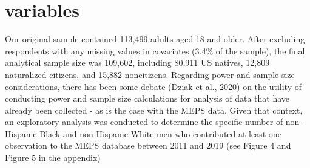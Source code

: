 \documentclass[../main.tex]{subfiles}
\begin{document}
\section{variables}

Our original sample contained 113,499 adults aged 18 and older. After excluding respondents with any missing values in covariates (3.4\% of the sample), the final
analytical sample size was 109,602, including 80,911 US natives, 12,809 naturalized citizens, and 15,882 noncitizens. Regarding power and sample size
considerations, there has been some debate (Dziak et al., 2020) on the utility of conducting power and sample size calculations for analysis of data that have already been collected -
as is the case with the MEPS data. Given that context, an exploratory analysis was conducted to determine the specific number of non-Hispanic Black and non-Hispanic White men who contributed at least one observation to the MEPS database between 2011 and 2019 (see Figure 4 and Figure 5 in the appendix)
\end{document}
